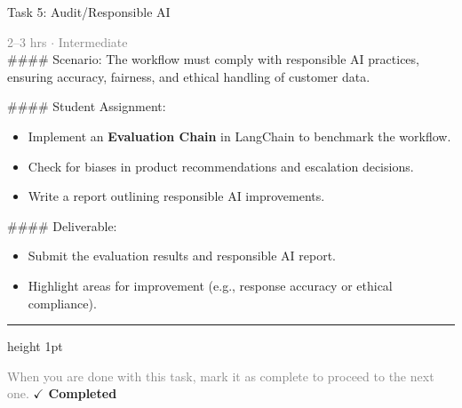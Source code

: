 \documentclass[10pt,a4paper]{article}
\begin{document}
\begin{taskbox}{Task 5: Audit/Responsible AI}

    {\small \textcolor{gray}{2--3 hrs $\cdot$ Intermediate}}\\[12pt]

    \#\#\#\# Scenario:
The workflow must comply with responsible AI practices, ensuring accuracy, fairness, and ethical handling of customer data.

\#\#\#\# Student Assignment:
\begin{itemize}
    \item Implement an \textbf{Evaluation Chain} in LangChain to benchmark the workflow.
    \item Check for biases in product recommendations and escalation decisions.
    \item Write a report outlining responsible AI improvements.
\end{itemize}

\#\#\#\# Deliverable:
\begin{itemize}
    \item Submit the evaluation results and responsible AI report.
    \item Highlight areas for improvement (e.g., response accuracy or ethical compliance).\par
\end{itemize}

    \vspace{16pt}

    \textcolor{cardBorder}{\hrule height 1pt}\vspace{8pt}

    \small \textcolor{gray}{When you are done with this task, mark it as complete to proceed to the next one.} \hfill \textbf{\textcolor{brandDark}{$\checkmark$ Completed}}

\end{taskbox}
\end{document}
